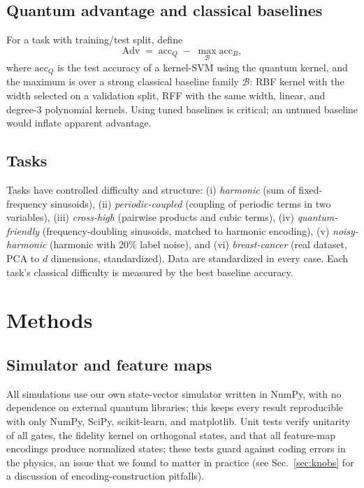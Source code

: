 \documentclass[a4paper,unpublished,onecolumn,nopdfoutputerror,12pt]{quantumarticle}
\begin{document}
\subsection{Quantum advantage and classical baselines}
\label{sec:defs-adv}

For a task with training/test split, define
\begin{equation}
  \mathrm{Adv} \;=\; \mathrm{acc}_Q \;-\; \max_{\mathcal{B}}\mathrm{acc}_B ,
\label{eq:adv}
\end{equation}
where $\mathrm{acc}_Q$ is the test accuracy of a kernel-SVM using the quantum kernel, and
the maximum is over a strong classical baseline family $\mathcal{B}$: RBF kernel with the
width selected on a validation split, RFF with the same width, linear, and degree-3
polynomial kernels. Using tuned baselines is critical; an untuned baseline would inflate
apparent advantage.

\subsection{Tasks}
\label{sec:defs-tasks}

Tasks have controlled difficulty and structure: (i) \emph{harmonic} (sum of
fixed-frequency sinusoids), (ii) \emph{periodic-coupled} (coupling of periodic terms in
two variables), (iii) \emph{cross-high} (pairwise products and cubic terms),
(iv) \emph{quantum-friendly} (frequency-doubling sinusoids, matched to harmonic encoding),
(v) \emph{noisy-harmonic} (harmonic with 20\% label noise), and (vi) \emph{breast-cancer}
(real dataset, PCA to $d$ dimensions, standardized). Data are standardized in every case.
Each task's classical difficulty is measured by the best baseline accuracy.

\section{Methods}
\label{sec:methods}

\subsection{Simulator and feature maps}
\label{sec:methods-sim}

All simulations use our own state-vector simulator written in NumPy, with no dependence on
external quantum libraries; this keeps every result reproducible with only NumPy,
SciPy, scikit-learn, and matplotlib. Unit tests verify unitarity of all gates, the
fidelity kernel on orthogonal states, and that all feature-map encodings produce
normalized states; these tests guard against coding errors in the physics, an issue that
we found to matter in practice (see Sec.~\ref{sec:knobs} for a discussion of
encoding-construction pitfalls).
\end{document}
